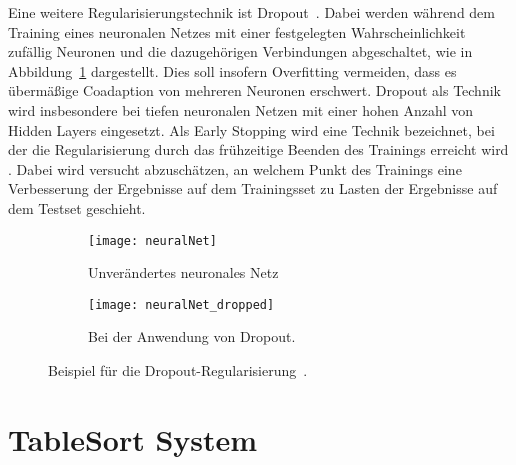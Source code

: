 
Eine weitere Regularisierungstechnik ist Dropout~\cite{JMLR:v15:srivastava14a}.
Dabei werden während dem Training eines neuronalen Netzes 
mit einer festgelegten Wahrscheinlichkeit zufällig Neuronen und die dazugehörigen Verbindungen abgeschaltet, 
wie in Abbildung~\ref{fig:dropout} dargestellt.
Dies soll insofern Overfitting vermeiden, dass es übermäßige Coadaption von mehreren Neuronen erschwert.
Dropout als Technik wird insbesondere bei tiefen neuronalen Netzen mit einer hohen Anzahl von Hidden Layers eingesetzt. 
Als Early Stopping wird eine Technik bezeichnet, bei der die Regularisierung durch das frühzeitige Beenden des Trainings erreicht wird \cite[Kapitel 7.8]{Goodfellow-et-al-2016}.
Dabei wird versucht abzuschätzen, an welchem Punkt des Trainings 
eine Verbesserung der Ergebnisse auf dem Trainingsset zu Lasten der Ergebnisse auf dem Testset geschieht.


\begin{figure}[h]
    \centering
    \begin{subfigure}[t]{0.4\textwidth}
		\texttt{[image: neuralNet]}
		\caption{Unverändertes neuronales Netz}
    \end{subfigure}
    \begin{subfigure}[t]{0.4\textwidth}
		\texttt{[image: neuralNet\_dropped]}
		\caption{Bei der Anwendung von Dropout.}
	\end{subfigure}
    \caption{Beispiel für die Dropout-Regularisierung~\cite{JMLR:v15:srivastava14a}.}
    \label{fig:dropout}
\end{figure}





\section{TableSort System}


